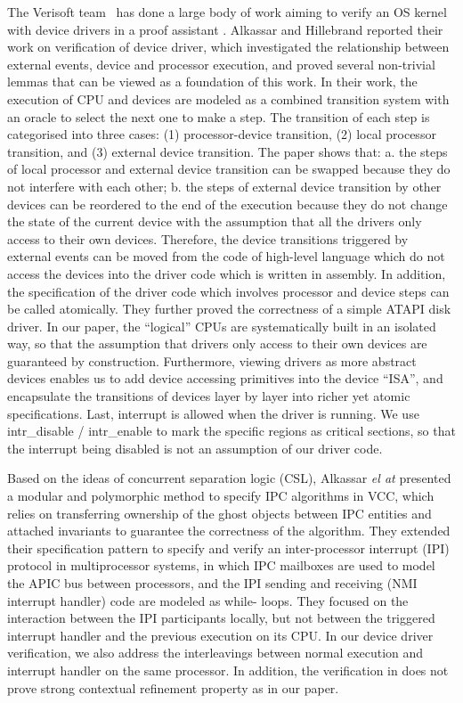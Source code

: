 The Verisoft team~\cite{verisoft07} has done a large body of work
aiming to verify an OS kernel with device drivers in a proof assistant
\cite{Alkassar:OSVE09,Alkassar:VSTTE08-225,Alkassar:VSTTE2010-71}.
Alkassar and Hillebrand \cite{Alkassar:VSTTE08-225} reported
their work on verification of device
driver, which investigated the relationship between external events, device
and processor execution, and proved several non-trivial lemmas that can be
viewed as a foundation of this work. In their work, the execution of CPU and
devices are modeled as a combined transition system with an oracle to select
the next one to make a step. The transition of each step is categorised into
three cases: (1) processor-device transition, (2) local processor transition,
and (3) external device transition. The paper shows that: a. the steps of
local processor and external device transition can be swapped because they do
not interfere with each other; b. the steps of external device transition by
other devices can be reordered to the end of the execution because they do not
change the state of the current device with the assumption that all the
drivers only access to their own devices. Therefore, the device transitions
triggered by external events can be moved from the code of high-level language
which do not access the devices into the driver code which is written in
assembly. In addition, the specification of the driver code which involves
processor and device steps can be called atomically. They further proved the
correctness of a simple ATAPI disk driver.
In our paper, the ``logical'' CPUs are systematically built in an isolated way,
so that the assumption that drivers only access to their own devices are
guaranteed by construction. Furthermore, viewing drivers as more abstract devices
enables us to add device accessing primitives into the device “ISA”, and
encapsulate the transitions of devices layer by layer into richer yet atomic
specifications. Last, interrupt is allowed when the driver is running. We use
\textsf{intr\_disable} / \textsf{intr\_enable} to mark the specific regions
as critical sections,
so that the interrupt being disabled is not an assumption of our driver code.

Based on the ideas of concurrent separation logic (CSL), Alkassar {\em el at}
\cite{Alkassar:IPC}
presented a modular and polymorphic method to specify IPC algorithms in VCC,
which relies on transferring ownership of the ghost objects between IPC
entities and attached invariants to guarantee the correctness of the
algorithm. They extended their specification pattern to specify and verify an
inter-processor interrupt (IPI) protocol in multiprocessor systems, in which
IPC mailboxes are used to model the APIC bus between processors, and the IPI
sending and receiving (NMI interrupt handler) code are modeled as while-
loops. They focused on the interaction between the IPI participants locally,
but not between the triggered interrupt handler and the previous execution on
its CPU. In our device driver verification, we also address the interleavings
between normal execution and interrupt handler on the same processor.
In addition, the verification in \cite{Alkassar:IPC} does not
prove strong contextual refinement property as in our paper.

